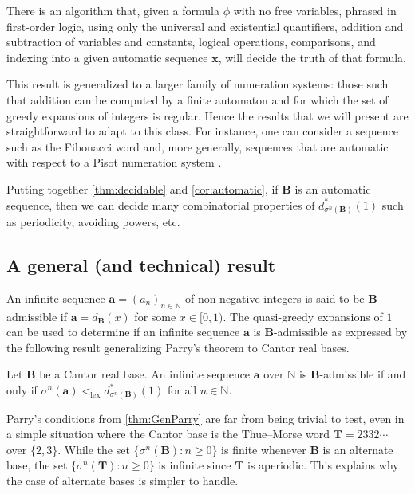 \documentclass[12pt,reqno]{amsart}
\newcommand{\B}{{\mathbf{B}}}
\newcommand{\lex}{{\mathrm{lex}}}
\begin{document}
\begin{theorem}\label{thm:decidable}
    There is an algorithm that, given a formula $\phi$ with no free
variables, phrased in first-order logic, using only the universal and existential
quantifiers, addition and subtraction of variables and constants, logical operations, comparisons, and indexing into a given automatic sequence $\mathbf{x}$, will decide the truth of that formula.
\end{theorem}

This result is generalized to a larger family of numeration systems: those such that addition can be computed by a finite automaton and for which the set of greedy expansions of integers is regular. Hence the results that we will present are straightforward to adapt to this class. For instance, one can consider a sequence such as the Fibonacci word and, more generally, sequences that are automatic with respect to a Pisot numeration system \cite{BruyereHansel,RigoBook}.

Putting together \cref{thm:decidable} and \cref{cor:automatic}, if $\B$ is an automatic sequence, then we can decide many combinatorial properties of $d_{\sigma^n(\B)}^*(1)$ such as periodicity, avoiding powers, etc. 




\subsection{A general (and technical) result}

An infinite sequence $\mathbf{a}=(a_n)_{n\in\mathbb{N}}$ of non-negative integers is said to be $\B$-admissible if $\mathbf{a}=d_{\B}(x)$ for some $x\in[0,1)$. The quasi-greedy expansions of $1$ can be used to determine if an infinite sequence $\mathbf{a}$ is $\B$-admissible as expressed by the following result generalizing Parry's theorem to Cantor real bases.

\begin{theorem}[\cite{CC2021}]
\label{thm:GenParry}
Let $\B$ be a Cantor real base. An infinite sequence $\mathbf{a}$ over $\mathbb{N}$ is $\B$-admissible if and only if
$\sigma^n(\mathbf{a}) <_{\mathrm{\lex}}d_{\sigma^n(\B)}^*(1)$ for all $n\in\mathbb{N}$.
 \end{theorem}

Parry's conditions from \cref{thm:GenParry} are far from being trivial to test, even in a simple situation where the Cantor base is the Thue--Morse word $\mathbf{T}=2332\cdots$ over $\{2,3\}$. While the set $\{\sigma^n(\mathbf{B}) : n\ge 0\}$ is finite whenever $\B$ is an alternate base, the set $\{\sigma^n(\mathbf{T}):n\ge 0\}$ is infinite since $\mathbf{T}$ is aperiodic. This explains why the case of alternate bases is simpler to handle.
\end{document}
